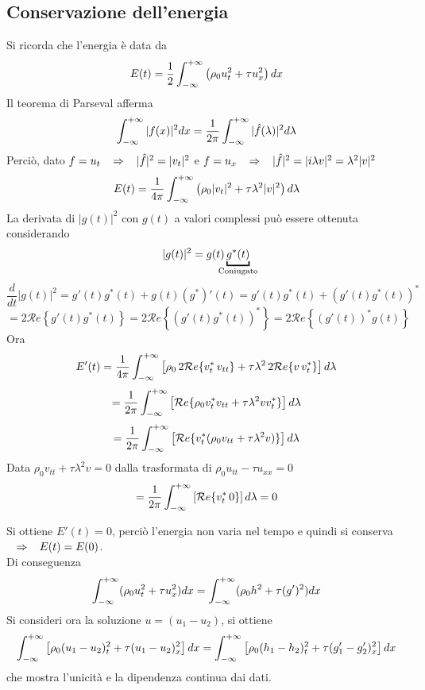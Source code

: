 \subsection{Conservazione dell'energia}
Si ricorda che l'energia \`e data da
\[
	E(t)=\frac{1}{2} \int_{- \infty}^{+ \infty} \left(
	\rho_0 u_t^2 + \tau u_x^2
	\right) dx
\]
Il teorema di Parseval afferma
\[
	\int_{- \infty}^{+ \infty} |f(x)|^2 dx =
	\frac{1}{2\pi}
	\int_{- \infty}^{+ \infty} |\hat{f}(\lambda)|^2d \lambda
\]
Perci\`o, dato $f=u_t \;\;\; \Rightarrow \;\;\; |\hat{f}|^2=|v_t|^2$ e
$f=u_x \;\;\; \Rightarrow \;\;\; |\hat{f}|^2=|i\lambda v|^2=\lambda^2|v|^2$
\[
	E(t)= \frac{1}{4 \pi} \int_{- \infty}^{+ \infty}
	\left(
	\rho_0 |v_t|^2 + \tau \lambda^2 |v|^2
	\right) d\lambda
\]
La derivata di $|g(t)|^2$ con $g(t)$ a valori complessi pu\`o essere ottenuta
considerando
\[
	|g(t)|^2= g(t)\underbracket{g^*(t)}_{\mathclap{\text{Coniugato}}}
\]
\[
	\frac{d}{dt}|g(t)|^2=
	g'(t) g^{*} (t) + g(t)(g^{*})'(t)= g'(t)g^{*}(t)+
	\left(
	g'(t)g^*(t)
	\right)^*
\]
\[
	=2 {\mathcal Re} \left\{ g'(t)g^*(t) \right\}
	=2 {\mathcal Re} \left\{ (g'(t)g^*(t))^* \right\}
	=2 {\mathcal Re} \left\{ (g'(t))^* g(t) \right\}
\]
Ora
\[
	E'(t)= \frac{1}{4\pi} \int_{- \infty}^{+ \infty} \left[
	\rho_0 \, 2 {\mathcal Re} \{v_t^* \, v_{tt}\}+
	\tau \lambda^2 \, 2 {\mathcal Re} \{ v \,v_t^* \}
	\right] d \lambda
\]
\[
	=\frac{1}{2\pi} \int_{- \infty}^{+ \infty} \left[
	{\mathcal Re} \{ \rho_0 v_t^* v_{tt} + \tau \lambda^2 vv_t^* \}
	\right] d \lambda
\]
\[
	=\frac{1}{2\pi} \int_{- \infty}^{+ \infty} \left[
	{\mathcal Re} \{ v_t^* (\rho_0 v_{tt} + \tau \lambda^2 v) \}
	\right] d \lambda
\]
Data $\rho_0 v_{tt} + \tau \lambda^2 v=0$ dalla trasformata di $\rho_0 u_{tt} -
\tau u_{xx}= 0$
\[
	=\frac{1}{2\pi} \int_{- \infty}^{+ \infty} \left[
	{\mathcal Re} \{ v_t^* \, 0 \}
	\right] d \lambda = 0
\]

Si ottiene $E'(t)=0$, perci\`o l'energia non varia nel tempo e quindi si
conserva $\;\;\; \Rightarrow \;\;\; E(t)=E(0)$.\\
Di conseguenza
\[
	\int_{- \infty}^{+ \infty} (\rho_0 u_t^2 + \tau u_x^2)dx=
	\int_{- \infty}^{+ \infty} (\rho_0h^2 + \tau (g')^2)dx
\]
Si consideri ora la soluzione $u=(u_1 - u_2)$, si ottiene
\[
	\int_{- \infty}^{+ \infty} \left[
	\rho_0 (u_1 - u_2)_t^2 + \tau (u_1 - u_2)_x^2
	\right]dx=
	\int_{- \infty}^{+ \infty} \left[
	\rho_0 (h_1 - h_2)_t^2 + \tau (g_1' - g_2')_x^2
	\right]dx
\]
che mostra l'unicit\`a e la dipendenza continua dai dati.

